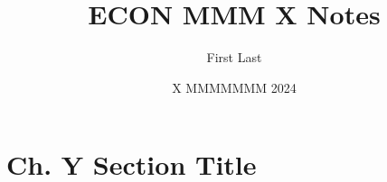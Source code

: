 \documentclass{scrartcl}
\title{ECON MMM X Notes}
\author{First Last}
\date{X MMMMMMM 2024}
\begin{document}
\maketitle

\section{Ch. Y Section Title}
\end{document}
